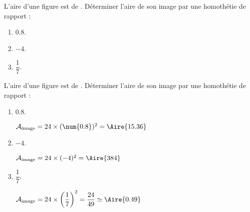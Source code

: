 \begin{exercice*}
    L'aire d'une figure est de . Déterminer l'aire de son image par une homothétie de rapport :
    \begin{enumerate}
        \item $\num{0.8}$.
        \item $-4$.
        \item $\dfrac{1}{7}$.
    \end{enumerate}    
\end{exercice*}
\begin{corrige}
    L'aire d'une figure est de . Déterminer l'aire de son image par une homothétie de rapport :
    \begin{enumerate}
        \item $\num{0.8}$.
        
        {\color{red} $\mathcal{A}_{\text{image}}=24 \times (\num{0.8})^2=\Aire{15.36}$}
        \item $-4$.
        
        {\color{red} $\mathcal{A}_{\text{image}}=24 \times (-4)^2=\Aire{384}$}
        \item $\dfrac{1}{7}$.
        
        {\color{red} $\mathcal{A}_{\text{image}}=24 \times \left( \dfrac{1}{7} \right)^2=\dfrac{24}{49} \simeq \Aire{0.49}$}
    \end{enumerate} 
\end{corrige}

